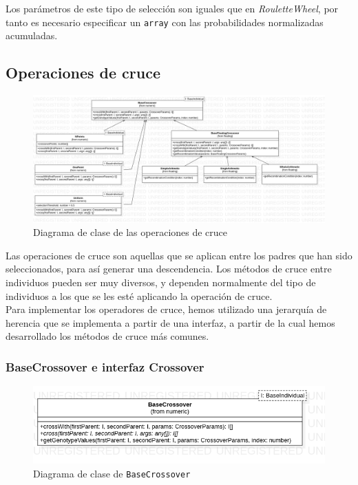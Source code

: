 Los parámetros de este tipo de selección son iguales que en \textit{RouletteWheel}, por tanto es necesario especificar un \texttt{array} con las probabilidades normalizadas acumuladas.

\subsection{Operaciones de cruce}

\begin{figure}[ht]
    \centering
    \includegraphics[scale=0.2]{mem/images/cap-4/4.2.6(Crossover)/Crossover.png}
    \caption{Diagrama de clase de las operaciones de cruce}
    \label{fig:my_label}
\end{figure}

Las operaciones de cruce son aquellas que se aplican entre los padres que han sido seleccionados, para así generar una descendencia. Los métodos de cruce entre individuos pueden ser muy diversos, y dependen normalmente del tipo de individuos a los que se les esté aplicando la operación de cruce.\\

Para implementar los operadores de cruce, hemos utilizado una jerarquía de herencia que se implementa a partir de una interfaz, a partir de la cual hemos desarrollado los métodos de cruce más comunes.


\subsubsection{BaseCrossover e interfaz Crossover}

\begin{figure}[ht]
    \centering
    \includegraphics[scale=0.5]{mem/images/cap-4/4.2.6(Crossover)/BaseCrossover.png}
    \caption{Diagrama de clase de \texttt{BaseCrossover}}
    \label{fig:my_label}
\end{figure}

